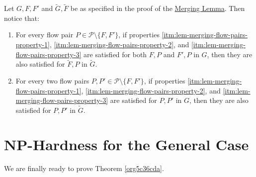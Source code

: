 \documentclass[fontsize=11pt,paper=a4]{book}
\begin{document}
\begin{remark}
Let \(G,F,F'\) and \(\tilde{G},\tilde{F}\) be as specified in the proof of the \hyperref[org859ddb4]{Merging Lemma}.
Then notice that:

\begin{enumerate}
\item \label{itm:remark-merging-flow-pairs-1}
For every flow pair \(P\in\mathcal{P}\setminus\{F,F'\}\), if properties \ref{itm:lem-merging-flow-pairs-property-1}, \ref{itm:lem-merging-flow-pairs-property-2}, and \ref{itm:lem-merging-flow-pairs-property-3} are satisfied for both \(F,P\) and \(F',P\) in \(G\), then they are also satisfied for \(\tilde{F},P\) in \(\tilde{G}\).

\item \label{itm:remark-merging-flow-pairs-2}
For every two flow pairs \(P,P'\in\mathcal{P}\setminus\{F,F'\}\), if properties \ref{itm:lem-merging-flow-pairs-property-1}, \ref{itm:lem-merging-flow-pairs-property-2}, and \ref{itm:lem-merging-flow-pairs-property-3} are satisfied for \(P,P'\) in \(G\), then they are also satisfied for \(P,P'\) in \(\tilde{G}\).
\end{enumerate}
\label{org8452511}
\end{remark}

\chapter{\(\textbf{NP}\)-Hardness for the General Case}
\label{sec:orgc1e7e41}

We are finally ready to prove Theorem \ref{org5c36cda}.
\end{document}
